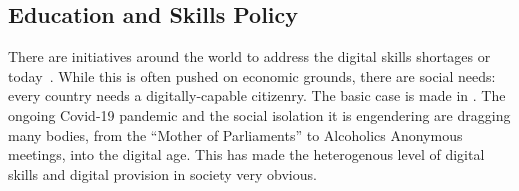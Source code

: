 \documentclass[conference]{IEEEtran}
\begin{document}
\subsection{Education and Skills Policy}

There are initiatives around the world to address the digital skills shortages or today~\cite{cece:2017}. While this is often pushed on economic grounds, there are social needs: every country needs a digitally-capable citizenry. The basic case is made in \cite{davenport-et-al:cep2019}. The ongoing Covid-19 pandemic and the social isolation it is engendering are dragging many bodies, from the ``Mother of Parliaments'' to Alcoholics Anonymous meetings, into the digital age. This has made the heterogenous level of digital skills and digital provision in society very obvious.

\end{document}
